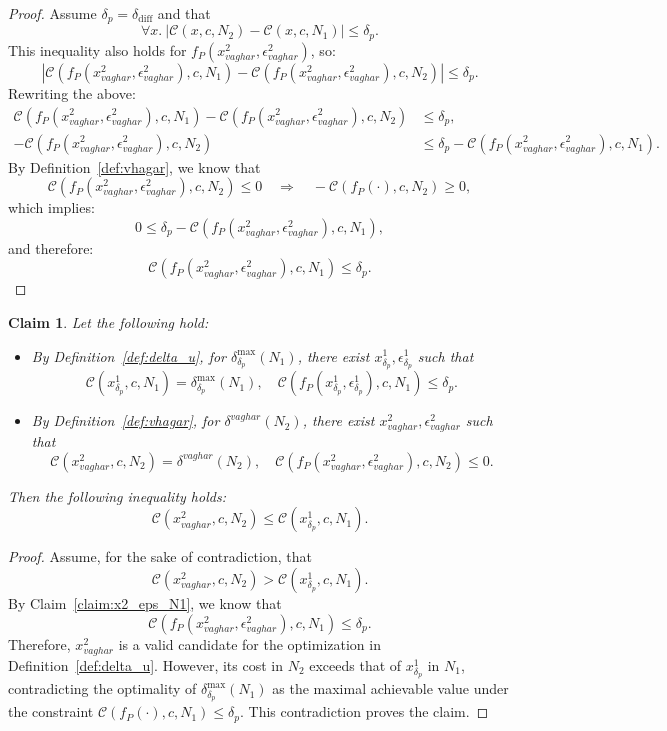 \documentclass[11pt]{article}
\newtheorem{claim}{Claim}
\begin{document}
\begin{proof}
Assume $\delta_p = \delta_{\text{diff}}$ and that
\[
\forall x.\ |\mathcal{C}(x, c, N_2) - \mathcal{C}(x, c, N_1)| \leq \delta_p.
\]
This inequality also holds for $f_P(x^2_{vaghar}, \epsilon^2_{vaghar})$, so:
\[
|\mathcal{C}(f_P(x^2_{vaghar}, \epsilon^2_{vaghar}), c, N_1) - \mathcal{C}(f_P(x^2_{vaghar}, \epsilon^2_{vaghar}), c, N_2)| \leq \delta_p.
\]
Rewriting the above:
\begin{align*}
\mathcal{C}(f_P(x^2_{vaghar}, \epsilon^2_{vaghar}), c, N_1) - \mathcal{C}(f_P(x^2_{vaghar}, \epsilon^2_{vaghar}), c, N_2) &\leq \delta_p, \\
-\mathcal{C}(f_P(x^2_{vaghar}, \epsilon^2_{vaghar}), c, N_2) &\leq \delta_p - \mathcal{C}(f_P(x^2_{vaghar}, \epsilon^2_{vaghar}), c, N_1).
\end{align*}
By Definition~\ref{def:vhagar}, we know that
\[
\mathcal{C}(f_P(x^2_{vaghar}, \epsilon^2_{vaghar}), c, N_2) \leq 0 \quad \Rightarrow \quad -\mathcal{C}(f_P(\cdot), c, N_2) \geq 0,
\]
which implies:
\[
0 \leq \delta_p - \mathcal{C}(f_P(x^2_{vaghar}, \epsilon^2_{vaghar}), c, N_1),
\]
and therefore:
\[
\mathcal{C}(f_P(x^2_{vaghar}, \epsilon^2_{vaghar}), c, N_1) \leq \delta_p.
\]
\end{proof}


\begin{claim}\label{claim:x2_x1_delta_p}
Let the following hold:
\begin{itemize}
    \item By Definition~\ref{def:delta_u}, for $\delta^\text{max}_{\delta_p}(N_1)$, there exist $x^1_{\delta_p}, \epsilon^1_{\delta_p}$ such that
    \[
    \mathcal{C}(x^1_{\delta_p}, c, N_1) = \delta^\text{max}_{\delta_p}(N_1), \quad \mathcal{C}(f_P(x^1_{\delta_p}, \epsilon^1_{\delta_p}), c, N_1) \leq \delta_p.
    \]
    
    \item By Definition~\ref{def:vhagar}, for $\delta^{vaghar}(N_2)$, there exist $x^2_{vaghar}, \epsilon^2_{vaghar}$ such that
    \[
    \mathcal{C}(x^2_{vaghar}, c, N_2) = \delta^{vaghar}(N_2), \quad \mathcal{C}(f_P(x^2_{vaghar}, \epsilon^2_{vaghar}), c, N_2) \leq 0.
    \]
\end{itemize}
Then the following inequality holds:
\[
\mathcal{C}(x^2_{vaghar}, c, N_2) \leq \mathcal{C}(x^1_{\delta_p}, c, N_1).
\]
\end{claim}

\begin{proof}
Assume, for the sake of contradiction, that
\[
\mathcal{C}(x^2_{vaghar}, c, N_2) > \mathcal{C}(x^1_{\delta_p}, c, N_1).
\]
By Claim~\ref{claim:x2_eps_N1}, we know that
\[
\mathcal{C}(f_P(x^2_{vaghar}, \epsilon^2_{vaghar}), c, N_1) \leq \delta_p.
\]
Therefore, $x^2_{vaghar}$ is a valid candidate for the optimization in Definition~\ref{def:delta_u}. However, its cost in $N_2$ exceeds that of $x^1_{\delta_p}$ in $N_1$, contradicting the optimality of $\delta^\text{max}_{\delta_p}(N_1)$ as the maximal achievable value under the constraint $\mathcal{C}(f_P(\cdot), c, N_1) \leq \delta_p$. This contradiction proves the claim.
\end{proof}
\end{document}
